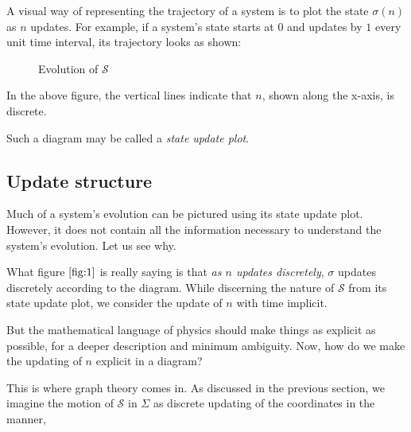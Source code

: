 \documentclass[12 pt]{article}
\begin{document}
A visual way of representing the trajectory of a system is to plot the state $\sigma \left( n \right)$ as $n$ updates. For example, if a system's state starts at $0$ and updates by $1$ every unit time interval, its trajectory looks as shown:

\begin{figure}[h]
\label{fig:1}
\centering
{}
\caption{Evolution of $\mathcal{S}$}
\end{figure}

In the above figure, the vertical lines indicate that $n$, shown along the x-axis, is discrete.

Such a diagram may be called a \emph{state update plot}.

\clearpage

\subsection{Update structure}

Much of a system's evolution can be pictured using its state update plot. However, it does not contain all the information necessary to understand the system's evolution. Let us see why.

What figure $\ref{fig:1}$ is really saying is that \emph{as $n$ updates discretely}, $\sigma$ updates discretely according to the diagram. While discerning the nature of $\mathcal{S}$ from its state update plot, we consider the update of $n$ with time implicit.

But the mathematical language of physics should make things as explicit as possible, for a deeper description and minimum ambiguity. Now, how do we make the updating of $n$ explicit in a diagram?

This is where graph theory comes in. As discussed in the previous section, we imagine the motion of $\mathcal{S}$ in $\Sigma$ as discrete updating of the coordinates in the manner,
\end{document}

